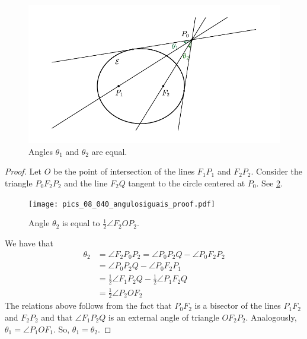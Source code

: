\begin{figure}
	\begin{center}
 \includegraphics[scale=0.9]{pics_tex/angulo_corda.pdf}
		\caption {Angles $\theta_1$ and $\theta_2$ are equal. 	\label{fig:angulocorda} }
	\end{center}

\end{figure}

 \begin{proof}
Let $O$ be the point of intersection of the lines $F_1P_1$ and $F_2P_2.$
Consider the triangle $P_0F_2P_2$ and the line $F_2Q$ tangent to the circle centered at $P_0.$ See \cref{fig:angulosiguaisproof}.


\begin{figure}
	\begin{center}
 \texttt{[image: pics\_08\_040\_angulosiguais\_proof.pdf]}
		\caption {Angle   $\theta_2$ is equal to  $\frac{1}{2}\angle F_2OP_2$.	\label{fig:angulosiguaisproof} }
	\end{center}

\end{figure}

We have that
\begin{align*}
    \theta_2&=\angle F_2P_0P_2=\angle P_0P_2Q-\angle P_0F_2P_2\\ 
    &= \angle P_0P_2Q-\angle P_0F_2P_1\\
    &=\frac{1}{2}\angle F_1P_2Q -\frac{1}{2} \angle P_1F_2Q\\
    &=
    \frac{1}{2} \angle P_2OF_2
 \end{align*}
 The relations above follows from the fact that $P_0F_2$ is a bisector of the lines $P_1F_2$ and $F_2P_2$ and   that  $\angle F_1P_2Q$ is an external angle of triangle $OF_2P_2.$
 Analogously, $\theta_1=\angle P_1OF_1$. So, $\theta_1=\theta_2.$
\end{proof}

